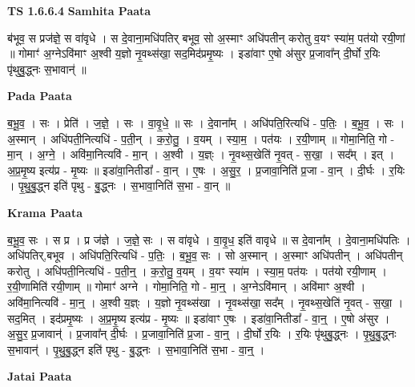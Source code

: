\documentclass[17pt]{extarticle}
\begin{document}
\textbf{TS 1.6.6.4 } \newline
\textbf{Samhita Paata} \newline

ब॑भूव॒ स प्रज॑ज्ञे॒ स वा॑वृधे । स दे॒वाना॒मधि॑पतिर् बभूव॒ सो अ॒स्माꣳ अधि॑पतीन् करोतु व॒यꣳ स्या॑म॒ पत॑यो रयी॒णां ॥ गोमाꣳ॑ अ॒ग्नेऽवि॑माꣳ अ॒श्वी य॒ज्ञो नृ॒वथ्स॑खा॒ सद॒मिद॑प्रमृ॒ष्यः । इडा॑वाꣳ ए॒षो अ॑सुर प्र॒जावा᳚न् दी॒र्घो र॒यिः पृ॑थुबु॒द्ध्नः स॒भावान्॑ ॥ \newline

\textbf{Pada Paata} \newline

ब॒भू॒व॒ । सः । प्रेति॑ । ज॒ज्ञे॒ । सः । वा॒वृ॒धे॒ ॥ सः । दे॒वाना᳚म् । अधि॑पति॒रित्यधि॑ - प॒तिः॒ । ब॒भू॒व॒ । सः । अ॒स्मान् । अधि॑पती॒नित्यधि॑ - प॒ती॒न् । क॒रो॒तु॒ । व॒यम् । स्या॒म॒ । पत॑यः । र॒यी॒णाम् ॥ गोमा॒निति॒ गो - मा॒न् । अ॒ग्ने॒ । अवि॑मा॒नित्यवि॑ - मा॒न् । अ॒श्वी । य॒ज्ञ्ः । नृ॒वथ्स॒खेति॑ नृ॒वत् - स॒खा॒ । सद᳚म् । इत् । अ॒प्र॒मृ॒ष्य इत्य॑प्र - मृ॒ष्यः ॥ इडा॑वा॒नितीडा᳚ - वा॒न् । ए॒षः । अ॒सु॒र॒ । प्र॒जावा॒निति॑ प्र॒जा - वा॒न् । दी॒र्घः । र॒यिः । पृ॒थु॒बु॒द्ध्न इति॑ पृथु - बु॒द्ध्नः । स॒भावा॒निति॑ स॒भा - वा॒न् ॥  \newline


\textbf{Krama Paata} \newline

ब॒भू॒व॒ सः । स प्र । प्र ज॑ज्ञे । ज॒ज्ञे॒ सः । स वा॑वृधे । वा॒वृ॒ध॒ इति॑ वावृधे ॥ स दे॒वाना᳚म् । दे॒वाना॒मधि॑पतिः । अधि॑पतिर्,बभूव । अधि॑पति॒रित्यधि॑ - प॒तिः॒ । ब॒भू॒व॒ सः । सो अ॒स्मान् । अ॒स्माꣳ अधि॑पतीन् । अधि॑पतीन् करोतु । अधि॑पती॒नित्यधि॑ - प॒ती॒न्॒ । क॒रो॒तु॒ व॒यम् । व॒यꣳ स्या॑म । स्या॒म॒ पत॑यः । पत॑यो रयी॒णाम् । र॒यी॒णामिति॑ रयी॒णाम् ॥ गोमाꣳ॑ अग्ने । गोमा॒निति॒ गो - मा॒न्॒ । अ॒ग्नेऽवि॑मान् । अवि॑माꣳ अ॒श्वी । अवि॑मा॒नित्यवि॑ - मा॒न्॒ । अ॒श्वी य॒ज्ञ्ः । य॒ज्ञो नृ॒वथ्स॑खा । नृ॒वथ्स॑खा॒ सद᳚म् । नृ॒वथ्स॒खेति॑ नृ॒वत् - स॒खा॒ । सद॒मित् । इद॑प्रमृ॒ष्यः । अ॒प्र॒मृ॒ष्य इत्य॑प्र - मृ॒ष्यः ॥ इडा॑वाꣳ ए॒षः । इडा॑वा॒नितीडा᳚ - वा॒न्॒ । ए॒षो अ॑सुर । अ॒सु॒र॒ प्र॒जावान्॑ । प्र॒जावा᳚न् दी॒र्घः । प्र॒जावा॒निति॑ प्र॒जा - वा॒न्॒ । दी॒र्घो र॒यिः । र॒यिः पृ॑थुबु॒द्ध्नः । पृ॒थु॒बु॒द्ध्नः स॒भावान्॑ । पृ॒थु॒बु॒द्ध्न इति॑ पृथु - बु॒द्ध्नः । स॒भावा॒निति॑ स॒भा - वा॒न्॒ । \newline

\textbf{Jatai Paata} \newline
\end{document}
